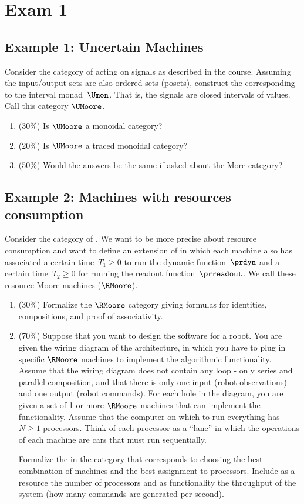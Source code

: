 \section{Exam 1}
\subsection{Example 1: Uncertain Machines}

Consider the category of  acting on signals as described in the course.
Assuming the input/output sets are also ordered sets (posets), construct the  corresponding to the interval monad~$\Umon$.
That is, the signals are closed intervals of values.
Call this category $\UMoore$.
\begin{enumerate}
    \item (30\%) Is $\UMoore$ a monoidal category?
    \item (20\%) Is $\UMoore$ a traced monoidal category?
    \item (50\%) Would the answers be the same if asked about the More category?
\end{enumerate}

\subsection{Example 2: Machines with resources consumption}
Consider the category of .
We want to be more precise about resource consumption and want to define an extension of  in which each machine also has associated a certain time~$T_1\geq 0$ to run the dynamic function~$\prdyn$ and a certain time~$T_2\geq 0$ for running the readout function~$\prreadout$.
We call these resource-Moore machines ($\RMoore$).

\begin{enumerate}
    \item (30\%) Formalize the $\RMoore$ category giving formulas for identities, compositions, and proof of associativity.
    \item (70\%) Suppose that you want to design the software for a robot.
          You are given the wiring diagram of the architecture, in which you have to plug in specific $\RMoore$ machines to implement the algorithmic functionality.
          Assume that the wiring diagram does not contain any loop - only series and parallel composition, and that there is only one input (robot observations) and one output (robot commands).
          For each hole in the diagram, you are given a set of 1 or more $\RMoore$ machines that can implement the functionality.
          Assume that the computer on which to run everything has~$N\geq 1$ processors.
          Think of each processor as a ``lane'' in which the operations of each machine are cars that must run sequentially.

          Formalize the  in the category \DPI that corresponds to choosing the best combination of machines and the best assignment to processors.
          Include as a resource the number of processors and as functionality the throughput of the system (how many commands are generated per second).
\end{enumerate}

